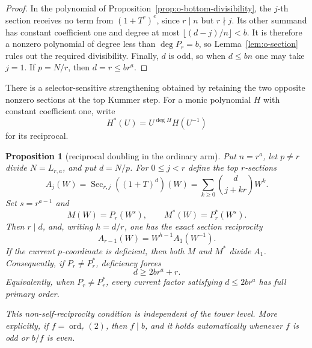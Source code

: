 \documentclass[11pt]{article}
\newtheorem{proposition}[theorem]{Proposition}
\theoremstyle{definition}
\theoremstyle{remark}
\begin{document}
\begin{proof}
In the polynomial of Proposition~\ref{prop:o-bottom-divisibility}, the
$j$-th section receives no term from $(1+T^r)^e$, since $r\mid n$ but
$r\nmid j$.  Its other summand has constant coefficient one and degree at
most $\lfloor(d-j)/n\rfloor<b$.  It is therefore a nonzero polynomial of degree
less than $\deg P_r=b$, so Lemma~\ref{lem:o-section} rules out the required
divisibility.  Finally, $d$ is odd, so when $d\leq bn$ one may take $j=1$.
If $p=N/r$, then $d=r\leq br^a$.
\end{proof}

There is a selector-sensitive strengthening obtained by retaining the two
opposite nonzero sections at the top Kummer step.  For a monic polynomial
$H$ with constant coefficient one, write
\[
 H^*(U)=U^{\deg H}H(U^{-1})
\]
for its reciprocal.

\begin{proposition}[reciprocal doubling in the ordinary arm]
\label{prop:o-reciprocal}
Put $n=r^a$, let $p\ne r$ divide $N=L_{r,a}$, and put $d=N/p$.
For $0\leq j<r$ define the top $r$-sections
\[
 A_j(W)=\operatorname{Sec}_{r,j}((1+T)^d)(W)
       =\sum_{k\geq0}\binom d{j+kr}W^k.
\]
Set $s=r^{a-1}$ and
\[
 M(W)=P_r(W^s),\qquad M^*(W)=P_r^*(W^s).
\]
Then $r\mid d$, and, writing $h=d/r$, one has the exact section reciprocity
\[
 A_{r-1}(W)=W^{h-1}A_1(W^{-1}).
\]
If the current $p$-coordinate is deficient, then both $M$ and $M^*$ divide
$A_1$.  Consequently, if $P_r\ne P_r^*$, deficiency forces
\[
 d\geq 2br^a+r.
\]
Equivalently, when $P_r\ne P_r^*$, every current factor satisfying
$d\leq2br^a$ has full primary order.

This non-self-reciprocity condition is independent of the tower level.  More
explicitly, if $f=\operatorname{ord}_r(2)$, then $f\mid b$, and it holds
automatically whenever $f$ is odd or $b/f$ is even.
\end{proposition}
\end{document}
